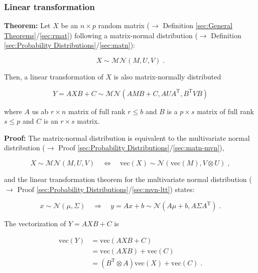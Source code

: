 \documentclass[a4paper,12pt,twoside]{book}
\begin{document}
\subsubsection[\textbf{Linear transformation}]{Linear transformation} \label{sec:matn-ltt}
\setcounter{equation}{0}

\textbf{Theorem:} Let $X$ be an $n \times p$ random matrix ($\rightarrow$ Definition \ref{sec:General Theorems}/\ref{sec:rmat}) following a matrix-normal distribution ($\rightarrow$ Definition \ref{sec:Probability Distributions}/\ref{sec:matn}):

\begin{equation} \label{eq:matn-ltt-matn}
X \sim \mathcal{MN}(M, U, V) \; .
\end{equation}

Then, a linear transformation of $X$ is also matrix-normally distributed

\begin{equation} \label{eq:matn-ltt-matn-trans}
Y = AXB + C \sim \mathcal{MN}(AMB+C, AUA^\mathrm{T}, B^\mathrm{T}VB)
\end{equation}

where $A$ us ab $r \times n$ matrix of full rank $r \leq b$ and $B$ is a $p \times s$ matrix of full rank $s \leq p$ and $C$ is an $r \times s$ matrix.


\vspace{1em}
\textbf{Proof:} The matrix-normal distribution is equivalent to the multivariate normal distribution ($\rightarrow$ Proof \ref{sec:Probability Distributions}/\ref{sec:matn-mvn}),

\begin{equation} \label{eq:matn-ltt-matn-mvn}
X \sim \mathcal{MN}(M, U, V) \quad \Leftrightarrow \quad \mathrm{vec}(X) \sim \mathcal{N}(\mathrm{vec}(M), V \otimes U) \; ,
\end{equation}

and the linear transformation theorem for the multivariate normal distribution ($\rightarrow$ Proof \ref{sec:Probability Distributions}/\ref{sec:mvn-ltt}) states:

\begin{equation} \label{eq:matn-ltt-mvn-ltt}
x \sim \mathcal{N}(\mu, \Sigma) \quad \Rightarrow \quad y = Ax + b \sim \mathcal{N}(A\mu + b, A \Sigma A^\mathrm{T}) \; .
\end{equation}

The vectorization of $Y = AXB + C$ is

\begin{equation} \label{eq:matn-ltt-vec-Y-s1}
\begin{split}
\mathrm{vec}(Y) &= \mathrm{vec}(AXB + C) \\
&= \mathrm{vec}(AXB) + \mathrm{vec}(C) \\
&= (B^\mathrm{T} \otimes A)\mathrm{vec}(X) + \mathrm{vec}(C) \; .
\end{split}
\end{equation}
\end{document}
